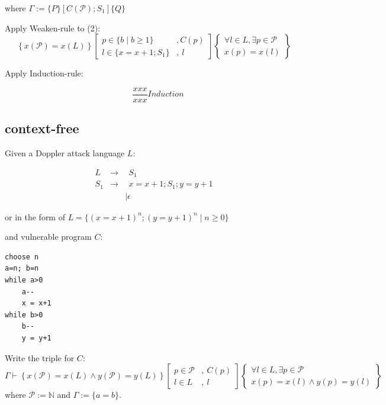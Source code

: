 \documentclass[12pt]{article}
\begin{document}
where $\Gamma := \{P\}\left[ C(\mathcal{P});S_1\right] \{Q\}$

Apply Weaken-rule to (2):
\[
\left\{ x(\mathcal{P})=x(L) \right\}
\left[
\begin{array}{ll}
p \in \{b \mid b \geq 1 \} & , C(p) \\
l \in \{x=x+1;S_1\} & , ~l
\end{array}
\right]
\left\{
\begin{array}{c}
\forall l \in L , \exists p \in \mathcal{P} \\
x(p) = x(l)
\end{array}
\right\}
\]

Apply Induction-rule:

\[
\quad
\frac{
xxx
}
{
xxx}
{Induction}
\]

\subsection{context-free}
Given a Doppler attack language $L$:

\[
\begin{array}{rrl}
     L & \rightarrow & ~~S_1 \\
     S_1 & \rightarrow & ~~x=x+1; S_1; y=y+1 \\
     & & \mid \epsilon
\end{array}
\]

or in the form of $L=\{(x=x+1)^n;(y=y+1)^n \mid n \geq 0\}$

and vulnerable program $C$:
\begin{lstlisting}
choose n
a=n; b=n
while a>0
    a--
    x = x+1
while b>0
    b--
    y = y+1
\end{lstlisting}

Write the triple for $C$:
\[
\Gamma \vdash \left\{ x(\mathcal{P})=x(L) \wedge y(\mathcal{P}) = y(L)\right\}
\left[
\begin{array}{ll}
p \in \mathcal{P} & , ~C(p) \\
l \in L & , ~l
\end{array}
\right]
\left\{
\begin{array}{c}
\forall l \in L , \exists p \in \mathcal{P} \\
x(p) = x(l) \wedge y(p) = y(l)
\end{array}
\right\}
\]
where $\mathcal{P}:=\mathbb{N}$ and $\Gamma := \{a=b\}$.



\end{document}
